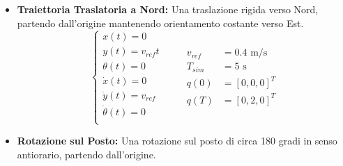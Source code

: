 \begin{itemize}
\begin{equation}
\begin{cases}
                  \dot{x}(t) = v_{ref} \cos(\omega_{ref} t) \\
                  \dot{y}(t) = v_{ref} \sin(\omega_{ref} t) \\
                  \dot{\theta}(t) = \omega_{ref}            \\
              \end{cases}\qquad
              \begin{aligned}
                  R            & = 3 \text{ m}       \\
                  v_{ref}      & = 0.6 \text{ m/s}   \\
                  \omega_{ref} & = 0.2 \text{ rad/s} \\
                  T_{sim}      & =  8 \text{ s}      \\
                  q(0)         & = [0, 0, 0]^T       \\
                  q(T)         & = [3, 3, 2\pi]^T    \\
              \end{aligned}
          \end{equation}
    \item \textbf{Traiettoria Traslatoria a Nord:} Una traslazione rigida verso Nord, partendo dall'origine mantenendo orientamento costante verso Est.
          \begin{equation}
              \begin{cases}
                  x(t) = 0             \\
                  y(t) = v_{ref} t     \\
                  \theta(t) = 0        \\
                  \dot{x}(t) = 0       \\
                  \dot{y}(t) = v_{ref} \\
                  \dot{\theta}(t) = 0  \\
              \end{cases}\qquad
              \begin{aligned}
                  v_{ref} & = 0.4 \text{ m/s} \\
                  T_{sim} & = 5 \text{ s}     \\
                  q(0)    & = [0, 0, 0]^T     \\
                  q(T)    & = [0, 2, 0]^T
              \end{aligned}
          \end{equation}
    \item \textbf{Rotazione sul Posto:} Una rotazione sul posto di circa 180 gradi in senso antiorario, partendo dall'origine.

\end{itemize}
